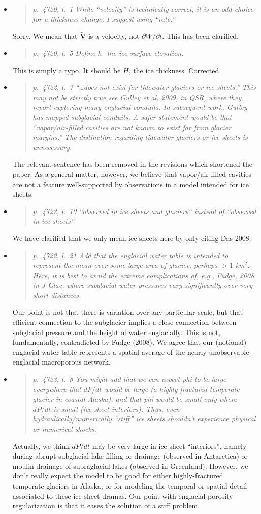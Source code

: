 \documentclass[11pt,reqno]{amsart}
\newcommand{\reply}[2]{
\medskip\medskip
\item  \begin{quote}
\emph{#1}
\end{quote}

\medskip
\noindent #2}
\begin{document}
\begin{itemize}
\reply{p.~4720, l.~1  While ``velocity'' is technically correct, it is an odd choice for a thickness change. I suggest using ``rate.''}
{Sorry.  We mean that $\tilde{\mathbf{V}}$ is a velocity, not $\partial W/\partial t$.  This has been clarified.}

\reply{p.~4720, l.~5 Define $h$- the ice surface elevation.}
{This is simply a typo.  It should be $H$, the ice thickness.  Corrected.}

\reply{p.~4722, l.~7 ``\dots does not exist for tidewater glaciers or ice sheets.'' This may not be strictly true see Gulley et al, 2009, in QSR, where they report exploring many englacial conduits.  In subsequent work, Gulley has mapped subglacial conduits.  A safer statement would be that ``vapor/air-filled cavities are not known to exist far from glacier margins.''  The distinction regarding tidewater glaciers or ice sheets is unnecessary.}
{The relevant sentence has been removed in the revisions which shortened the paper.  As a general matter, however, we believe that vapor/air-filled cavities are not a feature well-supported by observations in a model intended for ice sheets.}

\reply{p.~4722, l.~10 ``observed in ice sheets and glaciers`` instead of ``observed in ice sheets''}
{We have clarified that we only mean ice sheets here by only citing Das 2008.}

\reply{p.~4722, l.~21 Add that the englacial water table is intended to represent the mean
over some large area of glacier, perhaps $>1$ km$^2$. Here, it is best to avoid the extreme
complications of, e.g., Fudge, 2008 in J Glac, where subglacial water pressures vary
significantly over very short distances.}
{Our point is not that there is variation over any particular scale, but that efficient connection to the subglacier implies a close connection between subglacial pressure and the height of water englacially.  This is not, fundamentally, contradicted by Fudge (2008).  We agree that our (notional) englacial water table represents a spatial-average of the nearly-unobservable englacial macroporous network.}

\reply{p.~4723, l.~8 You might add that we can expect phi to be large everywhere that $dP/dt$ would be large (a highly fractured temperate glacier in coastal Alaska), and that phi would be small only where $dP/dt$ is small (ice sheet interiors). Thus, even hydraulically/numerically ``stiff'' ice sheets shouldn’t experience physical or numerical shocks.}
{Actually, we think $dP/dt$ may be very large in ice sheet ``interiors'', namely during abrupt subglacial lake filling or drainage (observed in Antarctica) or moulin drainage of supraglacial lakes (observed in Greenland).  However, we don't really expect the model to be good for either highly-fractured temperate glaciers in Alaska, or for modeling the temporal or spatial detail associated to these ice sheet dramas.  Our point with englacial porosity regularization is that it eases the solution of a stiff problem.}


\end{itemize}
\end{document}
